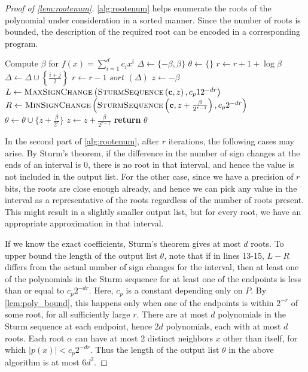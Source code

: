 \documentclass[a4paper,UKenglish,cleveref,autoref,thm-restate]{lipics-v2021}
\begin{document}
\begin{proof}[Proof of \cref{lem:rootenum}]
	\cref{alg:rootenum} helps enumerate the roots of the polynomial
	under consideration in a sorted manner. Since the number of roots is
	bounded, the description of the required root can be encoded in a
	corresponding program.
	\begin{algorithm}[H]
		\caption{Root enumeration}\label{alg:rootenum}
		\begin{algorithmic}[1]
			\State Compute $\beta$ for $f(x)=\sum_{i=1}^dc_ix^i$
			\State $\Delta\gets\{-\beta,\beta\}$ 
			\State $\theta\gets\{\}$ 
			\State $r\gets r+1+\log\beta$ 
			\State $\Delta\gets\Delta\cup\left\{\frac{i+j}{2}\right\}$
			\EndWhile
			\State $r\gets r-1$
			\EndWhile
			\Statex
			\State $\textit{sort }(\Delta)$
			\State $z\gets-\beta$
			\State $L \gets
			\textsc{MaxSignChange}\left(\textsc{SturmSequence}\left(\mathbf{c},z\right),c_p
			1      2^{-dr} \right)$
			\State $R \gets
			\textsc{MinSignChange}\left(\textsc{SturmSequence}\left(\mathbf{c},z+\frac{\beta}{2^{r-1}}\right),
			c_p 2^{-dr}\right)$
			\State $\theta\gets\theta\cup \{z+\frac{\beta}{2^r}\}$
			\EndIf
			\State $z\gets z+\frac{\beta}{2^{r-1}}$
			\EndWhile
			\State \textbf{return} $\theta$
			\EndProcedure
		\end{algorithmic}
	\end{algorithm}
	In the second part of \cref{alg:rootenum}, after $r$ iterations, the
	following cases may arise. By Sturm's theorem, if the difference in
	the number of sign changes at the ends of an interval is $0$, there
	is no root in that interval, and hence the value is not included in
	the output list. For the other case, since we have a precision of
	$r$ bits, the roots are close enough already, and hence we can pick
	any value in the interval as a representative of the roots
	regardless of the number of roots present. This might result in a
	slightly smaller output list, but for every root, we have an
	appropriate approximation in that interval.
	
	If we know the exact coefficients, Sturm's theorem gives at most
	$d$ roots. To upper bound the length of the output list $\theta$,
	note that if in lines 13-15, $L-R$ differs from the actual number of
	sign changes for the interval, then at least one of the polynomials
	in the Sturm sequence for at least one of the endpoints is less than
	or equal to $c_p 2^{-dr}$. Here, $c_p$ is a constant depending only
	on $P$. By \cref{lem:poly_bound}, this happens only when one of the
	endpoints is within $2^{-r}$ of some root, for all sufficiently
	large $r$. There are at most $d$ polynomials in the Sturm sequence
	at each endpoint, hence $2d$ polynomials, each with at most $d$
	roots. Each root $\alpha$ can have at most 2 distinct neighbors $x$
	other than itself, for which $|p(x)| < c_p 2^{-dr}$. Thus the length
	of the output list $\theta$ in the above algorithm is at most $6d^2$.
\end{proof}
\end{document}
